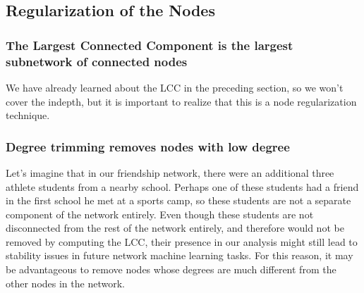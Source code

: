 \documentclass[letterpaper,10pt,english]{jupyterBook}
\begin{document}
\begin{sphinxVerbatim}[commandchars=\\\{\}]
  \PYG{p}{[} \PYG{p}{]} \PYG{p}{[}\PYG{p}{[} \PYG{p}{]} \PYG{p}{[} \PYG{p}{]}\PYG{p}{]}   
\end{sphinxVerbatim}

\noindent{}


\subsection{Regularization of the Nodes}
\label{\detokenize{representations/ch4/regularization:regularization-of-the-nodes}}

\subsubsection{The Largest Connected Component is the largest subnetwork of connected nodes}
\label{\detokenize{representations/ch4/regularization:the-largest-connected-component-is-the-largest-subnetwork-of-connected-nodes}}
\sphinxAtStartPar
We have already learned about the LCC in the preceding section, so we won’t cover the in\sphinxhyphen{}depth, but it is important to realize that this is a node regularization technique.


\subsubsection{Degree trimming removes nodes with low degree}
\label{\detokenize{representations/ch4/regularization:degree-trimming-removes-nodes-with-low-degree}}
\sphinxAtStartPar
Let’s imagine that in our friendship network, there were an additional three athlete students from a nearby school. Perhaps one of these students had a friend in the first school he met at a sports camp, so these students are not a separate component of the network entirely. Even though these students are not  disconnected from the rest of the network entirely, and therefore would not be removed by computing the LCC, their presence in our analysis might still lead to stability issues in future network machine learning tasks. For this reason, it may be advantageous to remove nodes whose degrees are much different from the other nodes in the network.
\end{document}
